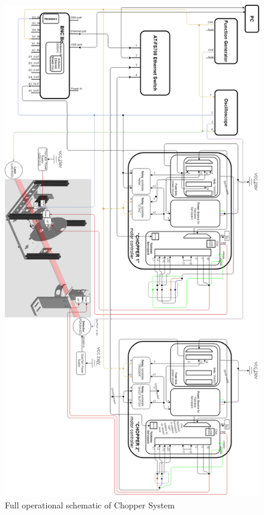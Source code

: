 \documentclass{article}
\begin{document}
    \begin{figure}[h]
        \centering
        \includegraphics[scale=0.35]{img/chopper_setup_schematic}
        \caption{Full operational schematic of Chopper System}
        \label{fig:chopper_setup_schematic}
    \end{figure}
    
\end{document}
